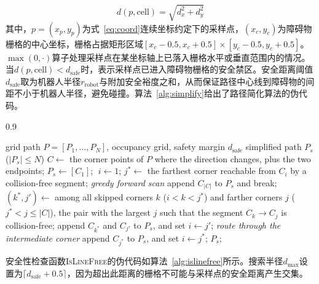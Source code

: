 \documentclass[lettersize,journal]{IEEEtran}
\begin{document}
\begin{equation}
d(p, \mathrm{cell}) = \sqrt{d_x^2 + d_y^2}
\label{eq:dist}
\end{equation}
其中，$p = (x_p, y_p)$为式~\textcolor{blue}{\eqref{eq:coord}}连续坐标约定下的采样点，$(x_c, y_c)$为障碍物栅格的中心坐标，栅格占据矩形区域$[x_c - 0.5, x_c + 0.5] \times [y_c - 0.5, y_c + 0.5]$。$\max(0, \cdot)$算子处理采样点在某坐标轴上已落入栅格水平或垂直范围内的情况。当$d(p, \mathrm{cell}) < d_{\mathrm{safe}}$时，表示采样点已进入障碍物栅格的安全禁区。安全距离阈值$d_{\mathrm{safe}}$取为机器人半径$r_{\mathrm{robot}}$与附加安全裕度之和，从而保证路径中心线到障碍物的间距不小于机器人半径，避免碰撞。算法~\textcolor{blue}{\ref{alg:simplify}}给出了路径简化算法的伪代码。
\begin{algorithm}[!t]
\caption{Safety-distance-aware path simplification}
\label{alg:simplify}
\begin{spacing}{0.9}
\begin{algorithmic}[1]
\REQUIRE grid path $P = [P_1, \ldots, P_N]$, occupancy grid, safety margin $d_{\mathrm{safe}}$
\ENSURE simplified path $P_s$ ($|P_s| \leq N$)
\STATE $C \gets$ the corner points of $P$ where the direction changes, plus the two endpoints;
\STATE $P_s \gets [C_1]$; $\; i \gets 1$;
\STATE $j^{*} \gets$ the farthest corner reachable from $C_i$ by a collision-free segment; \quad\textit{greedy forward scan}
\STATE append $C_{|C|}$ to $P_s$ and break;
\ENDIF
\STATE $(k^{*}, j') \gets$ among all skipped corners $k$ ($i < k < j^{*}$) and farther corners $j$ ($j^{*} < j \leq |C|$), the pair with the largest $j$ such that the segment $C_k \to C_j$ is collision-free;
\STATE append $C_{k^{*}}$ and $C_{j'}$ to $P_s$, and set $i \gets j'$; \quad\textit{route through the intermediate corner}
\ELSE
\STATE append $C_{j^{*}}$ to $P_s$, and set $i \gets j^{*}$;
\ENDIF
\ENDWHILE
\RETURN $P_s$;
\end{algorithmic}
\end{spacing}
\end{algorithm}

安全性检查函数\textsc{IsLineFree}的伪代码如算法~\textcolor{blue}{\ref{alg:islinefree}}所示。搜索半径$d_{\max}$设置为$\lceil d_{\mathrm{safe}} + 0.5 \rceil$，因为超出此距离的栅格不可能与采样点的安全距离产生交集。
\end{document}
